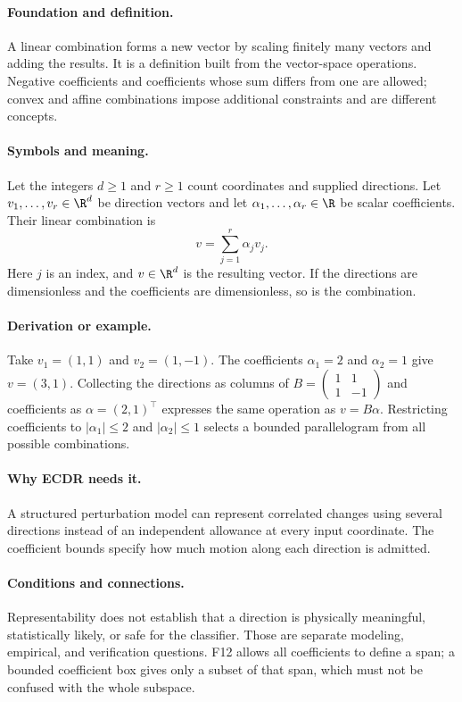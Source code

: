 \paragraph{Foundation and definition.}
A linear combination forms a new vector by scaling finitely many vectors
and adding the results. It is a definition built from the vector-space
operations. Negative coefficients and coefficients whose sum differs
from one are allowed; convex and affine combinations impose additional
constraints and are different concepts.
\paragraph{Symbols and meaning.}
Let the integers $d\ge1$ and $r\ge1$ count coordinates and supplied
directions. Let $v_1,\ldots,v_r\in\R^d$ be direction vectors and let
$\alpha_1,\ldots,\alpha_r\in\R$ be scalar coefficients. Their linear
combination is
\[
 v=\sum_{j=1}^{r}\alpha_j v_j.
\]
Here $j$ is an index, and $v\in\R^d$ is the resulting vector.
If the directions are dimensionless and the coefficients are
dimensionless, so is the combination.
\paragraph{Derivation or example.}
Take $v_1=(1,1)$ and $v_2=(1,-1)$. The coefficients
$\alpha_1=2$ and $\alpha_2=1$ give $v=(3,1)$.
Collecting the directions as columns of
$B=\begin{pmatrix}1&1\\1&-1\end{pmatrix}$ and coefficients as
$\alpha=(2,1)^\top$ expresses the same operation as $v=B\alpha$.
Restricting coefficients to $|\alpha_1|\le2$ and $|\alpha_2|\le1$
selects a bounded parallelogram from all possible combinations.
\paragraph{Why ECDR needs it.}
A structured perturbation model can represent correlated changes using
several directions instead of an independent allowance at every input
coordinate. The coefficient bounds specify how much motion along each
direction is admitted.
\paragraph{Conditions and connections.}
Representability does not establish that a direction is physically
meaningful, statistically likely, or safe for the classifier. Those are
separate modeling, empirical, and verification questions. F12 allows all
coefficients to define a span; a bounded coefficient box gives only a
subset of that span, which must not be confused with the whole subspace.

